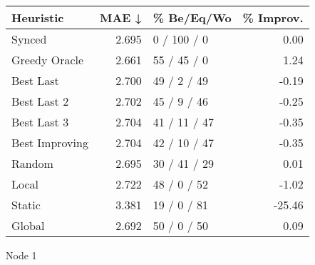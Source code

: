\begin{tabular}{lrlr}
\toprule
\textbf{Heuristic} & \textbf{MAE ↓} & \textbf{\% Be/Eq/Wo} & \textbf{\% Improv.} \\
\midrule
            Synced &          2.695 &          0 / 100 / 0 &                0.00 \\
     Greedy Oracle &          2.661 &          55 / 45 / 0 &                1.24 \\
         Best Last &          2.700 &          49 / 2 / 49 &               -0.19 \\
       Best Last 2 &          2.702 &          45 / 9 / 46 &               -0.25 \\
       Best Last 3 &          2.704 &         41 / 11 / 47 &               -0.35 \\
    Best Improving &          2.704 &         42 / 10 / 47 &               -0.35 \\
            Random &          2.695 &         30 / 41 / 29 &                0.01 \\
             Local &          2.722 &          48 / 0 / 52 &               -1.02 \\
            Static &          3.381 &          19 / 0 / 81 &              -25.46 \\
            Global &          2.692 &          50 / 0 / 50 &                0.09 \\
\bottomrule
\end{tabular}
\caption{Node 1}
\label{tab:hr_iid_lr01_le1_bs2_1}
